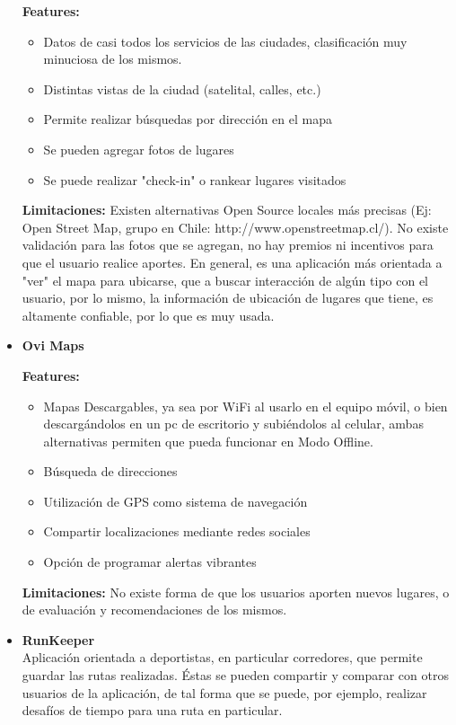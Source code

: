 \documentclass[10pt,letterpaper]{article}
\begin{document}
\begin{itemize}
\textbf{Features:}
\begin{itemize}
\item Datos de casi todos los servicios de las ciudades, clasificación muy minuciosa de los mismos.
\item Distintas vistas de la ciudad (satelital, calles, etc.)
\item Permite realizar búsquedas por dirección en el mapa
\item Se pueden agregar fotos de lugares
\item Se puede realizar "check-in" o rankear lugares visitados
\end{itemize}

\textbf{Limitaciones:} Existen alternativas Open Source locales más precisas (Ej: Open Street Map, grupo en Chile: http://www.openstreetmap.cl/). No existe validación para las fotos que se agregan, no hay premios ni incentivos para que el usuario realice aportes. En general, es una aplicación más orientada a "ver" el mapa para ubicarse, que a buscar interacción de algún tipo con el usuario, por lo mismo, la información de ubicación de lugares que tiene, es altamente confiable, por lo que es muy usada.\\

\item \textbf{Ovi Maps}

\textbf{Features:}
\begin{itemize}
\item Mapas Descargables, ya sea por WiFi al usarlo en el equipo móvil, o bien descargándolos en un pc de escritorio y subiéndolos al celular, ambas alternativas permiten que pueda funcionar en Modo Offline.
\item Búsqueda de direcciones
\item Utilización de GPS como sistema de navegación
\item Compartir localizaciones mediante redes sociales
\item Opción de programar alertas vibrantes
\end{itemize}

\textbf{Limitaciones:} No existe forma de que los usuarios aporten nuevos lugares, o de evaluación y recomendaciones de los mismos.\\

\item \textbf{RunKeeper}\\

Aplicación orientada a deportistas, en particular corredores, que permite guardar las rutas realizadas. Éstas se pueden compartir y comparar con otros usuarios de la aplicación, de tal forma que se puede, por ejemplo, realizar desafíos de tiempo para una ruta en particular.\\


\end{itemize}
\end{document}
